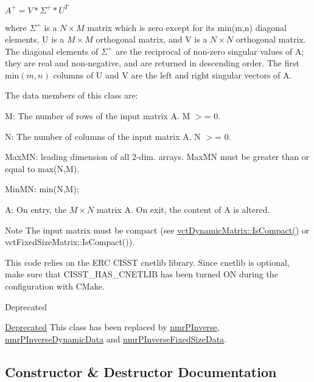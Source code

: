 $ A^{+} = V * \Sigma^{+} * U^{T} $

where $ \Sigma^{+} $ is a $ N \times M $ matrix which is zero except for its min(m,n) diagonal elements, U is a $ M \times M $ orthogonal matrix, and V is a $ N \times N $ orthogonal matrix. The diagonal elements of $ \Sigma^{+} $ are the reciprocal of non-\/zero singular values of A; they are real and non-\/negative, and are returned in descending order. The first $ \mbox{min}(m,n) $ columns of U and V are the left and right singular vectors of A.

The data members of this class are\+:


\begin{DoxyItemize}
\item M\+: The number of rows of the input matrix A. M $>$= 0.
\item N\+: The number of columns of the input matrix A. N $>$= 0.
\item Max\+M\+N\+: leading dimension of all 2-\/dim. arrays. Max\+M\+N must be greater than or equal to max(\+N,\+M).
\item Min\+M\+N\+: min(\+N,\+M);
\item A\+: On entry, the $ M \times N $ matrix A. On exit, the content of A is altered.
\end{DoxyItemize}

\begin{DoxyNote}{Note}
The input matrix must be compact (see \hyperlink{classvct_dynamic_const_matrix_base_ac061c634b765bbd24e2772375c4578a1}{vct\+Dynamic\+Matrix\+::\+Is\+Compact()} or vct\+Fixed\+Size\+Matrix\+::\+Is\+Compact()).

This code relies on the E\+R\+C C\+I\+S\+S\+T cnetlib library. Since cnetlib is optional, make sure that C\+I\+S\+S\+T\+\_\+\+H\+A\+S\+\_\+\+C\+N\+E\+T\+L\+I\+B has been turned O\+N during the configuration with C\+Make.
\end{DoxyNote}
\begin{DoxyRefDesc}{Deprecated}
\item[\hyperlink{deprecated__deprecated000002}{Deprecated}]This class has been replaced by \hyperlink{nmr_p_inverse_8h_a0694f8540c064c2aa6d8dbe488238462}{nmr\+P\+Inverse}, \hyperlink{classnmr_p_inverse_dynamic_data}{nmr\+P\+Inverse\+Dynamic\+Data} and \hyperlink{classnmr_p_inverse_fixed_size_data}{nmr\+P\+Inverse\+Fixed\+Size\+Data}. \end{DoxyRefDesc}


\subsection{Constructor \& Destructor Documentation}
\hypertarget{classnmr_p_inverse_solver_a9eab3e86808e546caf8ce01a99b49781}{}
